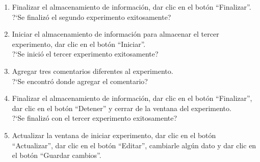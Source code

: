 \begin{enumerate}
	\item {Finalizar el almacenamiento de información, dar clic en el botón ``Finalizar''.\\
			?`Se finalizó el segundo experimento exitosamente?
	}
	\item {Iniciar el almacenamiento de información para almacenar el tercer experimento, dar clic en el botón ``Iniciar''.\\
			?`Se inició el tercer experimento exitosamente?
	}
	\item {Agregar tres comentarios diferentes al experimento.\\
			?`Se encontró donde agregar el comentario?
	}
	\item {Finalizar el almacenamiento de información, dar clic en el botón ``Finalizar'', dar clic en el botón ``Detener'' y cerrar de la ventana del experimento.\\
			?`Se finalizó con el tercer experimento exitosamente?
	}
	\item {Actualizar la ventana de iniciar experimento, dar clic en el botón ``Actualizar'', dar clic en el botón ``Editar'', cambiarle algún dato y dar clic en el botón ``Guardar cambios''.\\
}
\end{enumerate}
